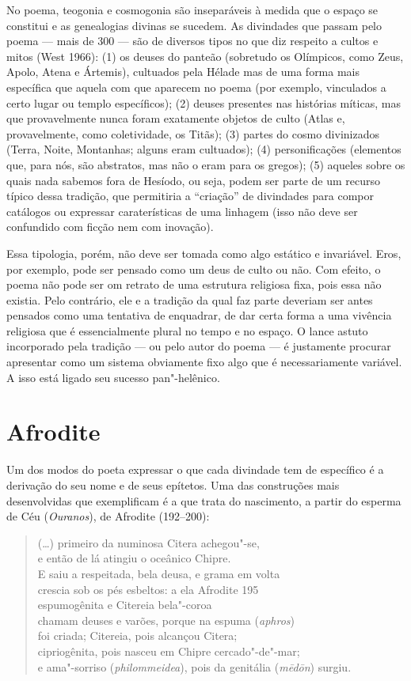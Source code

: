 No poema, teogonia e cosmogonia são inseparáveis à medida que o espaço
se constitui e as genealogias divinas se sucedem. As divindades que
passam pelo poema --- mais de 300 --- são de diversos tipos no que diz
respeito a cultos e mitos (West 1966): (1) os deuses do panteão
(sobretudo os Olímpicos, como Zeus, Apolo, Atena e Ártemis), cultuados
pela Hélade mas de uma forma mais específica que aquela com que aparecem
no poema (por exemplo, vinculados a certo lugar ou templo específicos);
(2) deuses presentes nas histórias míticas, mas que provavelmente nunca
foram exatamente objetos de culto (Atlas e, provavelmente, como
coletividade, os Titãs); (3) partes do cosmo divinizados (Terra, Noite,
Montanhas; alguns eram cultuados); (4) personificações (elementos que,
para nós, são abstratos, mas não o eram para os gregos); (5) aqueles
sobre os quais nada sabemos fora de Hesíodo, ou seja, podem ser parte de
um recurso típico dessa tradição, que permitiria a ``criação'' de
divindades para compor catálogos ou expressar caraterísticas de uma
linhagem (isso não deve ser confundido com ficção nem com inovação).

Essa tipologia, porém, não deve ser tomada como algo estático e
invariável. Eros, por exemplo, pode ser pensado como um deus de culto ou
não. Com efeito, o poema não pode ser om retrato de uma estrutura
religiosa fixa, pois essa não existia. Pelo contrário, ele e a tradição
da qual faz parte deveriam ser antes pensados como uma tentativa de
enquadrar, de dar certa forma a uma vivência religiosa que é
essencialmente plural no tempo e no espaço. O lance astuto incorporado
pela tradição --- ou pelo autor do poema --- é justamente procurar
apresentar como um sistema obviamente fixo algo que é necessariamente
variável. A isso está ligado seu sucesso pan"-helênico.

\section{Afrodite}

Um dos modos do poeta expressar o que cada divindade tem de específico é
a derivação do seu nome e de seus epítetos. Uma das construções mais
desenvolvidas que exemplificam é a que trata do nascimento, a partir do
esperma de Céu (\emph{Ouranos}), de Afrodite (192--200):

\begin{verse}
(\ldots{}) primeiro da numinosa Citera achegou"-se,\\
e então de lá atingiu o oceânico Chipre.\\
E saiu a respeitada, bela deusa, e grama em volta\\
crescia sob os pés esbeltos: a ela Afrodite \num{195}\\
espumogênita e Citereia bela"-coroa\\
chamam deuses e varões, porque na espuma (\emph{aphros})\\
foi criada; Citereia, pois alcançou Citera;\\
cipriogênita, pois nasceu em Chipre cercado"-de"-mar;\\
e ama"-sorriso (\emph{philommeidea}), pois da genitália (\emph{mēdōn}) surgiu.
\end{verse}

